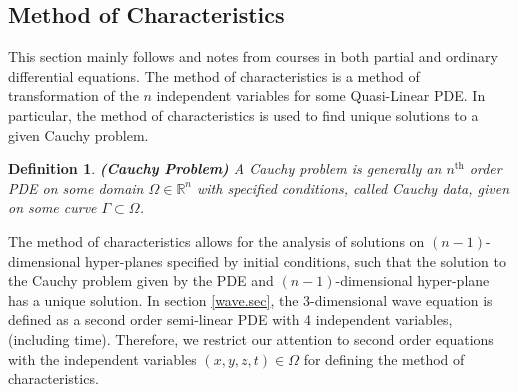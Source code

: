 \documentclass[12pt]{article}
\newtheorem{definition}{Definition}[section]
\theoremstyle{definition}
\numberwithin{equation}{section}
\begin{document}
{%
\subsection{Method of Characteristics}\label{character.sec}
This section mainly follows \cite{Kev} and notes from courses in both partial and ordinary differential equations. The method of characteristics is a method of transformation of the $n$ independent variables for some Quasi-Linear PDE. In particular, the method of characteristics is used to find unique solutions to a given Cauchy problem.
\begin{definition}\textbf{(Cauchy Problem)}
A Cauchy problem is generally an $n^{\text{th}}$ order PDE on some domain $\Omega\in\mathbb{R}^n$ with specified conditions, called Cauchy data, given on some curve $\Gamma\subset\Omega$.
\end{definition}

The method of characteristics allows for the analysis of solutions on $(n-1)$-dimensional hyper-planes specified by initial conditions, such that the solution to the Cauchy problem given by the PDE and $(n-1)$-dimensional hyper-plane has a unique solution. In section \ref{wave.sec}, the 3-dimensional wave equation is defined as a second order semi-linear PDE with 4 independent variables, (including time). Therefore, we restrict our attention to second order equations with the independent variables $(x,y,z,t)\in\Omega$ for defining the method of characteristics.

}
\end{document}
